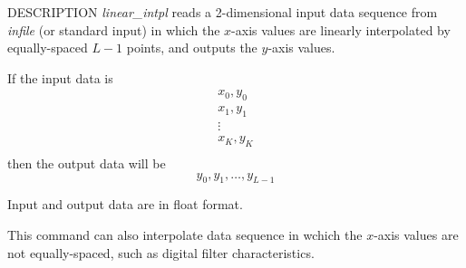 \begin{synopsis}
\item[linear\_intpl] [ --l $L$ ] [ --m $M$ ] [ --x $x_{min} \; x_{max}$ ] 
[ --i $x_{min}$ ] [ --j $x_{max}$ ] [ {\em infile} ]
\end{synopsis}

\begin{qsection}{DESCRIPTION}
{\em linear\_intpl} reads a 2-dimensional input data sequence
from {\em infile} (or standard input) in which the $x$-axis values are
linearly interpolated by equally-spaced $L-1$ points, and outputs the
$y$-axis values.

If the input data is
\begin{displaymath}
   \begin{matrix}
	x_0, y_0 \\
	x_1, y_1 \\
	\vdots   \\
	x_K, y_K \\
	\end{matrix}
\end{displaymath}
then the output data will be
\begin{displaymath}
y_0, y_1, \dots, y_{L-1}
\end{displaymath}

\par
Input and output data are in float format.
\par
This command can also interpolate data sequence in wchich the $x$-axis
values are not equally-spaced,
such as digital filter characteristics.

\end{qsection}

\begin{options}
\end{options}

